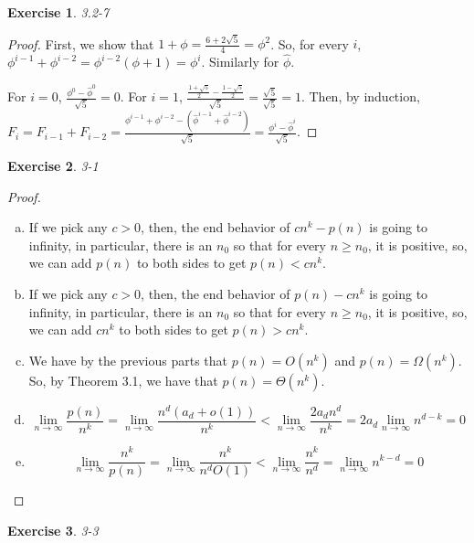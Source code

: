 \documentclass{article}
\newtheorem{th1}{Exercise}
\begin{document}
\begin{th1}\label{ex8}
3.2-7
\end{th1}
\begin{proof}
First, we show that $1+\phi = \frac{6+2\sqrt{5}}{4} = \phi^2$. So, for every $i$, $\phi^{i-1}+ \phi^{i-2} = \phi^{i-2}(\phi+1) = \phi^i$. Similarly for $\hat\phi$.

For $i=0$, $\frac{\phi^0 - \hat\phi^0}{\sqrt{5}} = 0$. For $i=1$, $\frac{\frac{1+\sqrt{5}}{2} - \frac{1-\sqrt{5}}{2}}{\sqrt{5}} = \frac{\sqrt{5}}{\sqrt{5}} = 1$. Then, by induction, $F_i = F_{i-1}+F_{i-2} = \frac{\phi^{i-1}+\phi^{i-2} - (\hat\phi^{i-1} +\hat\phi^{i-2})}{\sqrt{5}} = \frac{\phi^i - \hat\phi^i}{\sqrt{5}}$.

\end{proof}
\begin{th1}\label{ex9}
3-1
\end{th1}
\begin{proof}
\begin{enumerate}[a)]
\item
If we pick any $c>0$, then, the end behavior of $cn^k -p(n)$ is going to infinity, in particular, there is an $n_0$ so that for every $n\ge n_0$, it is positive, so, we can add $p(n)$ to both sides to get $p(n)<cn^k$.

\item
If we pick any $c>0$, then, the end behavior of $p(n)- cn^k$ is going to infinity, in particular, there is an $n_0$ so that for every $n\ge n_0$, it is positive, so, we can add $cn^k$ to both sides to get $p(n)>cn^k$.

\item
We have by the previous parts that $p(n) = O(n^k)$ and $p(n)= \Omega(n^k)$. So, by Theorem 3.1, we have that $p(n) = \Theta(n^k)$.

\item
\[
\lim_{n\rightarrow\infty} \frac{p(n)}{n^k} = \lim_{n\rightarrow\infty} \frac{n^d(a_d + o(1))}{n^k} < \lim_{n\rightarrow\infty} \frac{2a_dn^d}{n^k} = 2a_d\lim_{n\rightarrow\infty} n^{d-k} = 0
\]


\item
\[
\lim_{n\rightarrow\infty} \frac{n^k}{p(n)} = \lim_{n\rightarrow\infty} \frac{n^k}{n^d O(1)} < \lim_{n\rightarrow\infty} \frac{n^k}{n^d} = \lim_{n\rightarrow\infty} n^{k-d} = 0
\]

\end{enumerate}
\end{proof}
\begin{th1}\label{ex10}
3-3
\end{th1}
\end{document}
